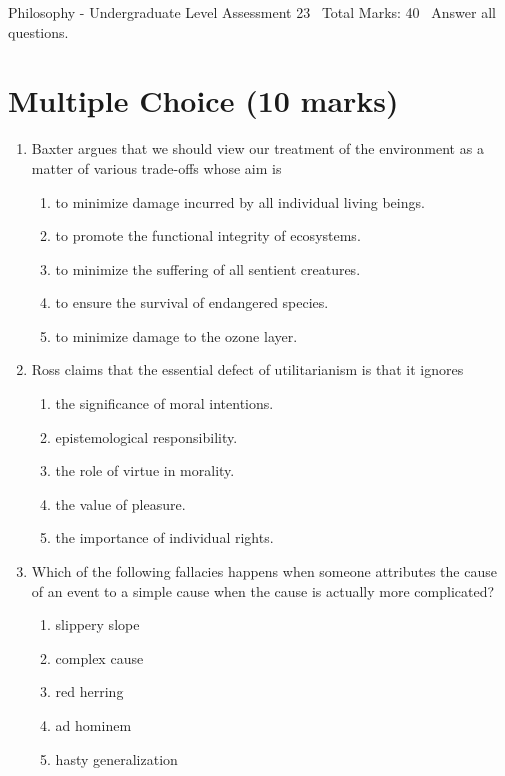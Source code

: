 \documentclass[12pt]{article}
\begin{document}
\begin{center}
Philosophy - Undergraduate Level Assessment 23 \
Total Marks: 40 \
Answer all questions.
\end{center}

\section*{Multiple Choice (10 marks)}
\begin{enumerate}[label=\arabic*.]
\item Baxter argues that we should view our treatment of the environment as a matter of various trade-offs whose aim is
\begin{enumerate}[label=(\alph*)]
    \item to minimize damage incurred by all individual living beings.
    \item to promote the functional integrity of ecosystems.
    \item to minimize the suffering of all sentient creatures.
    \item to ensure the survival of endangered species.
    \item to minimize damage to the ozone layer.
\end{enumerate}
\item Ross claims that the essential defect of utilitarianism is that it ignores
\begin{enumerate}[label=(\alph*)]
    \item the significance of moral intentions.
    \item epistemological responsibility.
    \item the role of virtue in morality.
    \item the value of pleasure.
    \item the importance of individual rights.
\end{enumerate}
\item Which of the following fallacies happens when someone attributes the cause of an event to a simple cause when the cause is actually more complicated?
\begin{enumerate}[label=(\alph*)]
    \item slippery slope
    \item complex cause
    \item red herring
    \item ad hominem
    \item hasty generalization
\end{enumerate}

\end{enumerate}
\end{document}
